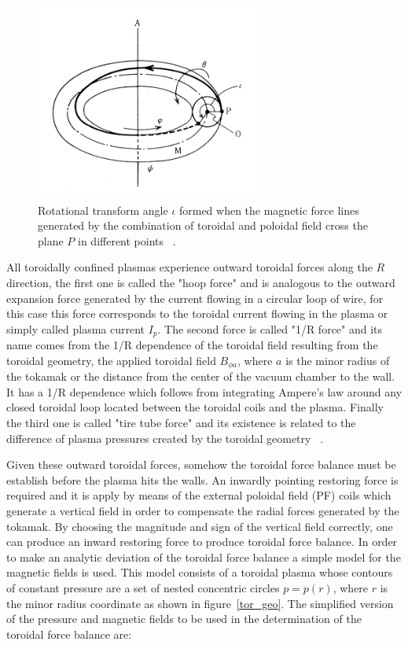 \begin{figure}
	\centering
	\includegraphics[width=0.655\textwidth]{Chp1/rotational_angle.png}
	\caption{Rotational transform angle $\iota$ formed when the magnetic force lines generated by the combination of toroidal and poloidal field cross the plane $P$ in different points  ~\cite[Chapter~3]{Miyamoto2011}. \label{rot_angle}}
\end{figure}

 All toroidally confined plasmas experience  outward toroidal forces along the $R$ direction, the first one is called the "hoop force" and is analogous to  the outward expansion force generated by the current flowing in a circular loop of wire, for this case this force corresponds to the toroidal current flowing in the plasma or simply called plasma current $I_p$. The second force is called "1/R force" and its name comes from the 1/R dependence of the toroidal field resulting from the toroidal geometry, the applied toroidal field $B_{\phi a}$,  where $a$ is the minor radius of the tokamak or the distance from the center of the vacuum chamber to the wall. It has a 1/R dependence which follows from integrating Ampere's law around any closed toroidal loop located between the toroidal coils and the plasma. Finally the third one is called "tire tube force" and its existence is related to the difference of plasma pressures created by the toroidal geometry ~\cite[Chapter~11]{Freidberg2007}. \smallskip 
 
Given these outward toroidal forces, somehow the  toroidal force balance must be establish before the plasma hits the walls. An inwardly pointing restoring force is required and it is apply by means of the external poloidal field (PF) coils which generate a vertical field in order to compensate the radial forces generated by the tokamak.  By choosing the magnitude and sign of the vertical field correctly, one can produce an inward restoring force to produce toroidal force balance. In order to make an analytic deviation of the toroidal force balance a simple model for the magnetic fields is used. This model consists of a toroidal plasma whose contours of constant pressure are a set of nested concentric circles $p=p(r)$, where $r$ is the minor radius coordinate as shown in figure~\ref{tor_geo}. The simplified version of the pressure and magnetic fields to be used in the determination of the toroidal force balance are:

